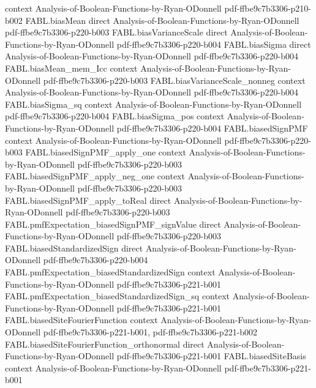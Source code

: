 \begin{theorem}
  {context}
  {Analysis-of-Boolean-Functions-by-Ryan-ODonnell}
  {pdf-ffbe9c7b3306-p210-b002}
\proofstep
  {FABL.biasMean}
  {direct}
  {Analysis-of-Boolean-Functions-by-Ryan-ODonnell}
  {pdf-ffbe9c7b3306-p220-b003}
\proofstep
  {FABL.biasVarianceScale}
  {direct}
  {Analysis-of-Boolean-Functions-by-Ryan-ODonnell}
  {pdf-ffbe9c7b3306-p220-b004}
\proofstep
  {FABL.biasSigma}
  {direct}
  {Analysis-of-Boolean-Functions-by-Ryan-ODonnell}
  {pdf-ffbe9c7b3306-p220-b004}
\proofstep
  {FABL.biasMean_mem_Icc}
  {context}
  {Analysis-of-Boolean-Functions-by-Ryan-ODonnell}
  {pdf-ffbe9c7b3306-p220-b003}
\proofstep
  {FABL.biasVarianceScale_nonneg}
  {context}
  {Analysis-of-Boolean-Functions-by-Ryan-ODonnell}
  {pdf-ffbe9c7b3306-p220-b004}
\proofstep
  {FABL.biasSigma_sq}
  {context}
  {Analysis-of-Boolean-Functions-by-Ryan-ODonnell}
  {pdf-ffbe9c7b3306-p220-b004}
\proofstep
  {FABL.biasSigma_pos}
  {context}
  {Analysis-of-Boolean-Functions-by-Ryan-ODonnell}
  {pdf-ffbe9c7b3306-p220-b004}
\proofstep
  {FABL.biasedSignPMF}
  {context}
  {Analysis-of-Boolean-Functions-by-Ryan-ODonnell}
  {pdf-ffbe9c7b3306-p220-b003}
\proofstep
  {FABL.biasedSignPMF_apply_one}
  {context}
  {Analysis-of-Boolean-Functions-by-Ryan-ODonnell}
  {pdf-ffbe9c7b3306-p220-b003}
\proofstep
  {FABL.biasedSignPMF_apply_neg_one}
  {context}
  {Analysis-of-Boolean-Functions-by-Ryan-ODonnell}
  {pdf-ffbe9c7b3306-p220-b003}
\proofstep
  {FABL.biasedSignPMF_apply_toReal}
  {direct}
  {Analysis-of-Boolean-Functions-by-Ryan-ODonnell}
  {pdf-ffbe9c7b3306-p220-b003}
\proofstep
  {FABL.pmfExpectation_biasedSignPMF_signValue}
  {direct}
  {Analysis-of-Boolean-Functions-by-Ryan-ODonnell}
  {pdf-ffbe9c7b3306-p220-b003}
\proofstep
  {FABL.biasedStandardizedSign}
  {direct}
  {Analysis-of-Boolean-Functions-by-Ryan-ODonnell}
  {pdf-ffbe9c7b3306-p220-b004}
\proofstep
  {FABL.pmfExpectation_biasedStandardizedSign}
  {context}
  {Analysis-of-Boolean-Functions-by-Ryan-ODonnell}
  {pdf-ffbe9c7b3306-p221-b001}
\proofstep
  {FABL.pmfExpectation_biasedStandardizedSign_sq}
  {context}
  {Analysis-of-Boolean-Functions-by-Ryan-ODonnell}
  {pdf-ffbe9c7b3306-p221-b001}
\proofstep
  {FABL.biasedSiteFourierFunction}
  {context}
  {Analysis-of-Boolean-Functions-by-Ryan-ODonnell}
  {pdf-ffbe9c7b3306-p221-b001,
    pdf-ffbe9c7b3306-p221-b002}
\proofstep
  {FABL.biasedSiteFourierFunction_orthonormal}
  {direct}
  {Analysis-of-Boolean-Functions-by-Ryan-ODonnell}
  {pdf-ffbe9c7b3306-p221-b001}
\proofstep
  {FABL.biasedSiteBasis}
  {context}
  {Analysis-of-Boolean-Functions-by-Ryan-ODonnell}
  {pdf-ffbe9c7b3306-p221-b001}
\proofstep

\end{theorem}
